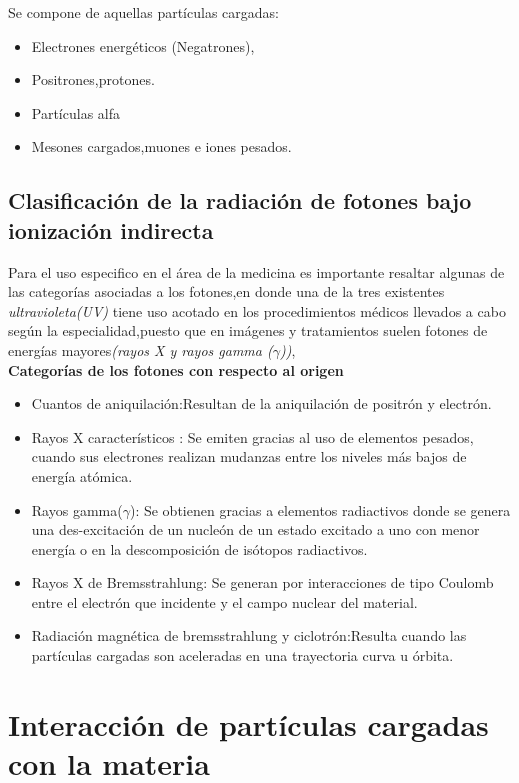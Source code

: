 \documentclass[12pt,fleqn]{book} %
\numberwithin{equation}{section} %
\numberwithin{figure}{section} %
\numberwithin{table}{section} %
\begin{document}
Se compone de aquellas partículas cargadas:
\begin{itemize}
 \item  Electrones energéticos (Negatrones),
\item Positrones,protones.
\item Partículas  alfa
\item Mesones cargados,muones e iones pesados.
\end{itemize}

\subsection{Clasificación de la radiación de fotones bajo ionización indirecta}
Para el uso especifico en el área de la medicina es importante resaltar algunas de las categorías asociadas a los fotones,en donde una de la tres existentes \textit{ ultravioleta(UV)} tiene uso acotado en los procedimientos médicos llevados a cabo según la especialidad,puesto que en imágenes y tratamientos suelen fotones de energías mayores\textit{(rayos X y rayos gamma ($\gamma$))},
\\

\textbf{ Categorías de los fotones con respecto al origen}
\begin{itemize}

\item Cuantos de aniquilación:Resultan de la aniquilación de positrón y electrón. 
\item Rayos X característicos : Se emiten gracias al uso de  elementos pesados, cuando sus electrones realizan mudanzas entre los niveles más bajos de energía atómica.
\item Rayos gamma($\gamma$): Se obtienen gracias a elementos radiactivos donde se genera una des-excitación de un nucleón de un estado excitado a uno con menor energía o en la descomposición de isótopos radiactivos.

\item Rayos X de Bremsstrahlung: Se generan por interacciones de tipo Coulomb entre el electrón que incidente y el campo nuclear del material.

\item Radiación magnética de bremsstrahlung y ciclotrón:Resulta cuando las partículas cargadas son aceleradas en una trayectoria curva u órbita.

\end{itemize}


\section{Interacción de partículas cargadas con la materia}
 
\end{document}

